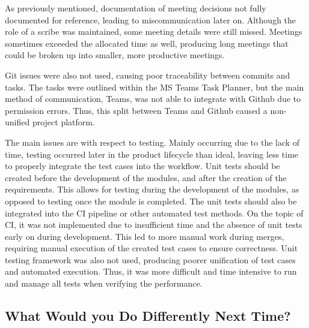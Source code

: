 \documentclass{article}
\begin{document}
As previously mentioned, documentation of meeting decisions not fully documented for reference, leading to miscommunication later on. Although the role of a scribe was maintained, some meeting details were still missed. Meetings sometimes exceeded the allocated time as well, producing long meetings that could be broken up into smaller, more productive meetings. 

Git issues were also not used, causing poor traceability between commits and tasks. The tasks were outlined within the MS Teams Task Planner, but the main method of communication, Teams, was not able to integrate with Github due to permission errors. Thus, this split between Teams and Github caused a non-unified project platform.

The main issues are with respect to testing. Mainly occurring due to the lack of time, testing occurred later in the product lifecycle than ideal, leaving less time to properly integrate the test cases into the workflow.
Unit tests should be created before the development of the modules, and after the creation of the requirements. This allows for testing during the development of the modules, as opposed to testing once the module is completed. The unit tests should also be integrated into the CI pipeline or other automated test methods. 
On the topic of CI, it was not implemented due to insufficient time and the absence of unit tests early on during development. This led to more manual work during merges, requiring manual execution of the created test cases to ensure correctness. 
Unit testing framework was also not used, producing poorer unification of test cases and automated execution. Thus, it was more difficult and time intensive to run and manage all tests when verifying the performance.

\subsection{What Would you Do Differently Next Time?}
\end{document}
